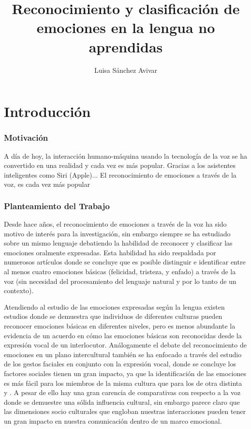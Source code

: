 \documentclass[11pt,a4paper,spanish]{book}
\begin{document}
	\title{Reconocimiento y clasificación de emociones en la lengua no aprendidas}
	\author{Luisa Sánchez Avivar}
	
	
	\mainmatter
	\chapter{Introducción}
	
	\subsection{Motivación}
	A día de hoy, la interacción humano-máquina usando la tecnología de la voz se ha convertido en una realidad y cada vez es más popular. Gracias a los asistentes inteligentes como Siri (Apple)...
	El reconocimiento de emociones a través de la voz, es cada vez más popular
	
	\subsection{Planteamiento del Trabajo}
	Desde hace años, el reconocimiento de emociones a través de la voz ha sido motivo de interés para la investigación, sin embargo siempre se ha estudiado sobre un mismo lenguaje debatiendo la habilidad de reconocer y clasificar las emociones oralmente expresadas. Esta habilidad ha sido respaldada por numerosos artículos donde se concluye que es posible distinguir e identificar entre al menos cuatro emociones básicas (felicidad, tristeza, y enfado) a través de la voz (sin necesidad del procesamiento del lenguaje natural y por lo tanto de un contexto).
	
	Atendiendo al estudio de las emociones expresadas según la lengua existen estudios donde se demuestra que individuos de diferentes culturas pueden reconocer emociones básicas en diferentes niveles, pero es menos abundante la evidencia de un acuerdo en cómo las emociones básicas son reconocidas desde la expresión vocal de un interlocutor.%
	Análogamente el debate del reconocimiento de emociones en un plano intercultural también se ha enfocado a través del estudio de los gestos faciales en conjunto con la expresión vocal, donde se concluye los factores sociales tienen un gran impacto, ya que la identificación de las emociones es más fácil para los miembros de la misma cultura que para los de otra distinta \cite{Pell2009a} y \cite{Pell2009}. A pesar de ello hay una gran carencia de comparativas con respecto a la voz donde se demuestre una sólida influencia cultural, sin embargo parece claro que las dimensiones socio culturales que engloban nuestras interacciones pueden tener un gran impacto en nuestra comunicación dentro de un marco emocional.
	
\end{document}
